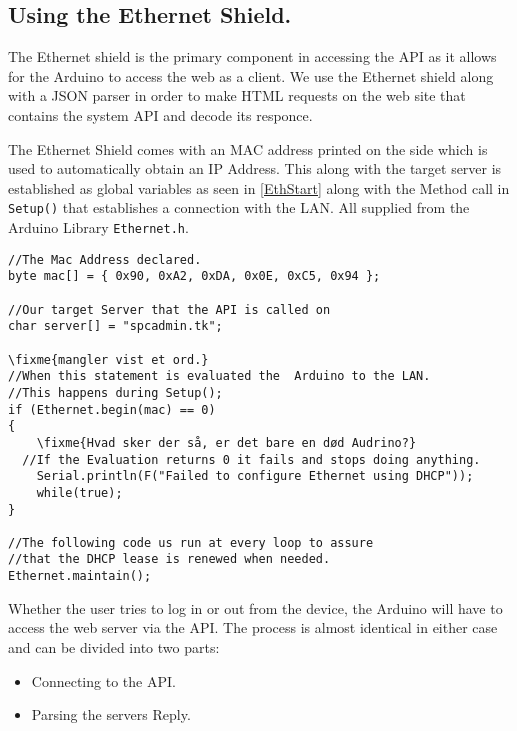 \subsection{Using the Ethernet Shield.}
The Ethernet shield is the primary component in accessing the API as it allows for the Arduino to access the web as a client.
We use the Ethernet shield along with a JSON parser in order to make HTML requests on the web site that contains the system API and decode its responce.

The Ethernet Shield comes with an MAC address printed on the side which is used to automatically obtain an IP Address.
This along with the target server is established as global variables as seen in \autoref{EthStart} along with the Method call in \verb|Setup()| that establishes a connection with the LAN. All supplied from the Arduino Library \verb|Ethernet.h|.
\begin{lstlisting}[frame=single, label=EthStart, caption=The Method Calls used to establish and maintain a connection.]
//The Mac Address declared.
byte mac[] = { 0x90, 0xA2, 0xDA, 0x0E, 0xC5, 0x94 };

//Our target Server that the API is called on
char server[] = "spcadmin.tk";

\fixme{mangler vist et ord.}
//When this statement is evaluated the  Arduino to the LAN.
//This happens during Setup();
if (Ethernet.begin(mac) == 0) 
{
	\fixme{Hvad sker der så, er det bare en død Audrino?}
  //If the Evaluation returns 0 it fails and stops doing anything.
	Serial.println(F("Failed to configure Ethernet using DHCP"));
	while(true); 
}

//The following code us run at every loop to assure
//that the DHCP lease is renewed when needed.
Ethernet.maintain();
\end{lstlisting}

Whether the user tries to log in or out from the device, the Arduino will have to access the web server via the API.
The process is almost identical in either case and can be divided into two parts:
\begin{itemize}
	\item Connecting to the API.
	\item Parsing the servers Reply.
\end{itemize}

